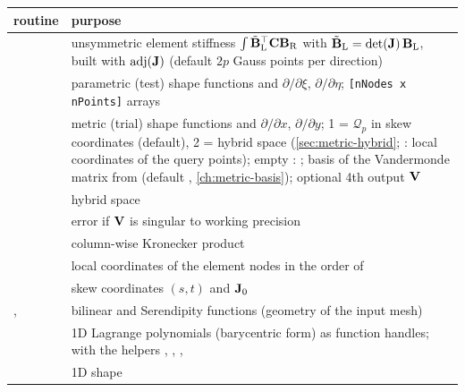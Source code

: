\begin{xltabular}{\linewidth}{@{}P{6.4cm}L@{}}
  \toprule
  routine & purpose \\
  \midrule
  \endhead
   & unsymmetric element
    stiffness $\int\limits \tilde{\mathbf{B}}_\mathrm{L}^{\top}\mathbf{C}\mathbf{B}_\mathrm{R}$
    with $\tilde{\mathbf{B}}_\mathrm{L}=\det(\mathbf{J})\,\mathbf{B}_\mathrm{L}$, built
    with $\operatorname{adj}(\mathbf{J})$ (default $2p$ Gauss
    points per direction) \\
   & parametric (test)
    shape functions and $\partial/\partial\xi$, $\partial/\partial\eta$;
    \texttt{[nNodes x nPoints]} arrays \\
   &
    metric (trial) shape functions and $\partial/\partial x$, $\partial/\partial y$;
     1 = $\mathcal Q_p$ in skew coordinates (default),
    2 = hybrid space (\cref{sec:metric-hybrid}; : local coordinates of the
    query points); empty : ; basis of the
    Vandermonde matrix from  (default ,
    \cref{ch:metric-basis}); optional 4th output $\mathbf{V}$ \\
   & hybrid space \\
   & error if $\mathbf{V}$ is singular
    to working precision \\
   & column-wise Kronecker product \\
   & local coordinates of the element
    nodes in the order of  \\
   & skew
    coordinates $(s,t)$ and $\mathbf{J}_0$ \\
  ,  & bilinear and
    Serendipity functions (geometry of the input mesh) \\
   & 1D Lagrange polynomials
    (barycentric form) as function handles; with the helpers
    , ,
    ,  \\
   & 1D shape

\end{xltabular}
